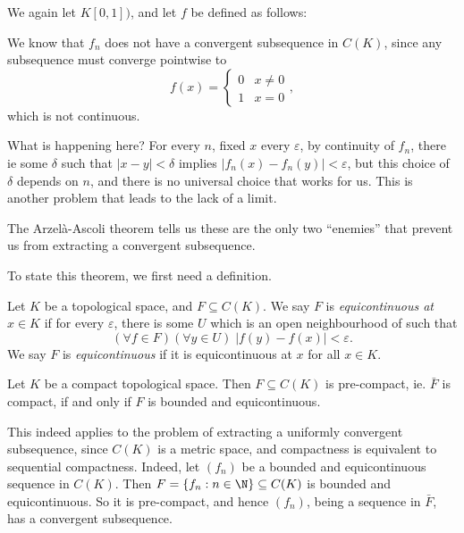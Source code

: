 \documentclass[a4paper]{article}
\begin{document}
\begin{eg}
  We again let $K[0, 1])$, and let $f$ be defined as follows:
  \begin{center}
  \end{center}
  We know that $f_n$ does not have a convergent subsequence in $C(K)$, since any subsequence must converge pointwise to
  \[
    f(x) =
    \begin{cases}
      0 & x \not= 0\\
      1 & x = 0
    \end{cases},
  \]
  which is not continuous.
\end{eg}
What is happening here? For every $n$, fixed $x$ every $\varepsilon$, by continuity of $f_n$, there ie some $\delta$ such that $|x - y| < \delta$ implies $|f_n(x) - f_n(y)| < \varepsilon$, but this choice of $\delta$ depends on $n$, and there is no universal choice that works for us. This is another problem that leads to the lack of a limit.

The Arzel\`a-Ascoli theorem tells us these are the only two ``enemies'' that prevent us from extracting a convergent subsequence.

To state this theorem, we first need a definition.
\begin{defi}[Equicontinuous]
  Let $K$ be a topological space, and $F\subseteq C(K)$. We say $F$ is \emph{equicontinuous at $x \in K$} if for every $\varepsilon$, there is some $U$ which is an open neighbourhood of such that
  \[
    (\forall f \in F)(\forall y \in U)\; |f(y) - f(x)| < \varepsilon.
  \]
  We say $F$ is \emph{equicontinuous} if it is equicontinuous at $x$ for all $x \in K$.
\end{defi}

\begin{thm}
  Let $K$ be a compact topological space. Then $F\subseteq C(K)$ is pre-compact, ie. $\bar{F}$ is compact, if and only if $F$ is bounded and equicontinuous.
\end{thm}
This indeed applies to the problem of extracting a uniformly convergent subsequence, since $C(K)$ is a metric space, and compactness is equivalent to sequential compactness. Indeed, let $(f_n)$ be a bounded and equicontinuous sequence in $C(K)$. Then $F = \{f_n: n \in \N\} \subseteq C(K)$ is bounded and equicontinuous. So it is pre-compact, and hence $(f_n)$, being a sequence in $\bar{F}$, has a convergent subsequence.
\end{document}
